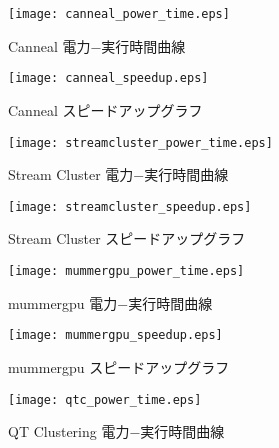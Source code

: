 \begin{figure}[t]
 \begin{center}
  \texttt{[image: canneal\_power\_time.eps]}
 \end{center}
 \caption{Canneal 電力−実行時間曲線}
 \label{fig:canneal_power_time}
\end{figure}

\begin{figure}[t]
 \begin{center}
  \texttt{[image: canneal\_speedup.eps]}
 \end{center}
 \caption{Canneal スピードアップグラフ}
 \label{fig:canneal_speedup}
\end{figure}

\begin{figure}[t]
 \begin{center}
  \texttt{[image: streamcluster\_power\_time.eps]}
 \end{center}
 \caption{Stream Cluster 電力−実行時間曲線}
 \label{fig:streamcluster_power_time}
\end{figure}

\begin{figure}[t]
 \begin{center}
  \texttt{[image: streamcluster\_speedup.eps]}
 \end{center}
 \caption{Stream Cluster スピードアップグラフ}
 \label{fig:streamcluster_speedup}
\end{figure}

\begin{figure}[t]
 \begin{center}
  \texttt{[image: mummergpu\_power\_time.eps]}
 \end{center}
 \caption{mummergpu 電力−実行時間曲線}
 \label{fig:mummergpu_power_time}
\end{figure}

\begin{figure}[t]
 \begin{center}
  \texttt{[image: mummergpu\_speedup.eps]}
 \end{center}
 \caption{mummergpu スピードアップグラフ}
 \label{fig:mummergpu_speedup}
\end{figure}

\begin{figure}[t]
 \begin{center}
  \texttt{[image: qtc\_power\_time.eps]}
 \end{center}
 \caption{QT Clustering 電力−実行時間曲線}
 \label{fig:qtclustering_power_time}
\end{figure}

